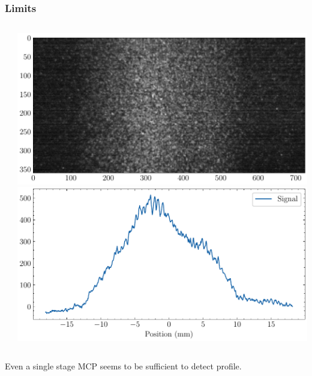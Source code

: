 \begin{frame}
  \frametitle{Limits}
  \begin{columns}[T]
    \begin{column}{0.45\textwidth}

    \end{column}
    \begin{column}{0.45\textwidth}
      \includegraphics[width=1\textwidth]{04_Test/fig/fig000_limits_IPHI_a}
      \includegraphics[width=1\textwidth]{04_Test/fig/fig000_limits_IPHI_b}
    \end{column}
  \end{columns}
  \begin{alertblock}{}
    Even a single stage MCP seems to be sufficient to detect profile.
  \end{alertblock}
\end{frame}